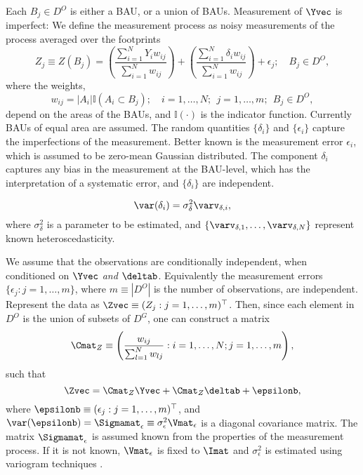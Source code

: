 Each $B_j \in D^O$ is either a BAU, or a union of BAUs. Measurement of $\Yvec$ is imperfect: We define the measurement process as noisy measurements of the process averaged over the footprints
\begin{equation}\label{eq:meas_process}
Z_j \equiv Z(B_j) = \left(\frac{\sum_{i =1}^N Y_i w_{ij}}{\sum_{i=1}^N w_{ij}}\right) + \left(\frac{\sum_{i =1}^N \delta_i w_{ij}}{\sum_{i=1}^N w_{ij}}\right) + \epsilon_j; \quad B_j \in D^O,
\end{equation}
where the weights,
$$ w_{ij} = |A_i|\mathbb{I}(A_i \subset B_j); \quad i = 1,\dots,N;~~j = 1,\dots, m; ~~B_j \in D^O,$$
depend on the areas of the BAUs, and $\mathbb{I}(\cdot)$ is the indicator function. Currently BAUs of equal area are assumed.   The random quantities $\{\delta_i\}$ and $\{\epsilon_i\}$ capture the imperfections of the measurement. Better known is the measurement error $\epsilon_i$, which is assumed to be zero-mean Gaussian distributed. The component $\delta_i$ captures any bias in the measurement at the BAU-level, which has the interpretation of a systematic error, and $\{\delta_i\}$ are independent.


\begin{equation*}
\var(\delta_i) = \sigma^2_\delta \varv_{\delta,i},
\end{equation*}
where $\sigma^2_\delta$ is a parameter to be estimated, and $\{\varv_{\delta,1},\dots,\varv_{\delta,N}\}$  represent known heteroscedasticity.

We assume that the observations are conditionally independent, when conditioned on $\Yvec$ \emph{and} $\deltab$. Equivalently the measurement errors $\{\epsilon_j: j = 1,\dots,m\}$, where $m \equiv |D^O|$ is the number of observations, are independent. Represent the data as $\Zvec \equiv (Z_j : j = 1,\dots,m)^\top$. Then, since each element in $D^O$ is the union of subsets of $D^G$, one can construct a matrix
$$
\Cmat_Z \equiv \left(\frac{w_{ij}}{\sum_{l=1}^N w_{lj}} : i = 1,\dots,N; j = 1,\dots,m\right),
$$
such that
\begin{equation*}
\Zvec = \Cmat_Z\Yvec + \Cmat_Z\deltab +  \epsilonb,
\end{equation*}
\noindent where $\epsilonb \equiv (\epsilon_j : j = 1,\dots,m)^\top$, and $\var(\epsilonb) = \Sigmamat_\epsilon \equiv \sigma^2_\epsilon\Vmat_\epsilon$ is a diagonal covariance matrix. The matrix $\Sigmamat_\epsilon$ is assumed known from the properties of the measurement process. If it is not known, $\Vmat_\epsilon$ is fixed to $\Imat$ and $\sigma^2_\epsilon$ is estimated using variogram techniques \citep{Kang_2009}.

